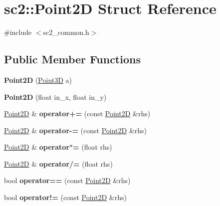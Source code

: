\hypertarget{structsc2_1_1_point2_d}{}\section{sc2\+:\+:Point2D Struct Reference}
\label{structsc2_1_1_point2_d}


{\ttfamily \#include $<$sc2\+\_\+common.\+h$>$}

\subsection*{Public Member Functions}
\begin{DoxyCompactItemize}
\item 
\mbox{\label{structsc2_1_1_point2_d_a83406df6d5f17ca5b860b8a50c1ea3d8}} 
{\bfseries Point2D} (\hyperlink{structsc2_1_1_point3_d}{Point3D} a)
\item 
\mbox{\label{structsc2_1_1_point2_d_a58c45e3ea9780c98b2b8d843ba8f446c}} 
{\bfseries Point2D} (float in\+\_\+x, float in\+\_\+y)
\item 
\mbox{\label{structsc2_1_1_point2_d_afc0211a8902e5d8338449002494a16b3}} 
\hyperlink{structsc2_1_1_point2_d}{Point2D} \& {\bfseries operator+=} (const \hyperlink{structsc2_1_1_point2_d}{Point2D} \&rhs)
\item 
\mbox{\label{structsc2_1_1_point2_d_a5c2de2d11b06fbf93220068dea12a698}} 
\hyperlink{structsc2_1_1_point2_d}{Point2D} \& {\bfseries operator-\/=} (const \hyperlink{structsc2_1_1_point2_d}{Point2D} \&rhs)
\item 
\mbox{\label{structsc2_1_1_point2_d_abbf5facb424ab9ddec00beba106a0f43}} 
\hyperlink{structsc2_1_1_point2_d}{Point2D} \& {\bfseries operator$\ast$=} (float rhs)
\item 
\mbox{\label{structsc2_1_1_point2_d_ae0022cafc9721ff7206782c23bb236fc}} 
\hyperlink{structsc2_1_1_point2_d}{Point2D} \& {\bfseries operator/=} (float rhs)
\item 
\mbox{\label{structsc2_1_1_point2_d_abb5cb5aa2ef2a7eed671d27f058eb8f1}} 
bool {\bfseries operator==} (const \hyperlink{structsc2_1_1_point2_d}{Point2D} \&rhs)
\item 
\mbox{\label{structsc2_1_1_point2_d_ac2cf79f219e1f4a17de3e71edd20b1ce}} 
bool {\bfseries operator!=} (const \hyperlink{structsc2_1_1_point2_d}{Point2D} \&rhs)
\end{DoxyCompactItemize}
